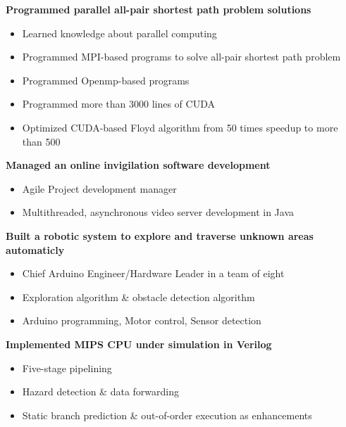 \documentclass[a4paper, 12pt]{article}
\newenvironment{changemargin}[2]{%
  \begin{list}{}{%
      \setlength{\topsep}{0pt}%
      \setlength{\leftmargin}{#1}%
      \setlength{\rightmargin}{#2}%
      \setlength{\listparindent}{\parindent}%
      \setlength{\itemindent}{\parindent}%
      \setlength{\parsep}{\parskip}%
    }%
  \item[]}{\end{list}
}
\newenvironment{body}
{
\vspace*{-16pt}
\begin{changemargin}{-0.25in}{-0.5in}
}
{
\end{changemargin}
}
\begin{document}
\begin{body}
  \vspace{14pt}
  \textbf{Programmed parallel all-pair shortest path problem solutions}\\
  \vspace*{-6pt}
    \begin{itemize} \itemsep -0pt \small
        \item Learned knowledge about parallel computing
        \item Programmed MPI-based programs to solve all-pair shortest path problem
        \item Programmed Openmp-based programs
        \item Programmed more than 3000 lines of CUDA
        \item Optimized CUDA-based Floyd algorithm from 50 times speedup to more than 500
    \end{itemize}
  \vspace*{-6pt}
  \textbf{Managed an online invigilation software development}\\
  \vspace*{-6pt}
    \begin{itemize} \itemsep -0pt \small
        \item Agile Project development manager
        \item Multithreaded, asynchronous video server development in Java
    \end{itemize}
  \vspace*{-6pt}
  \textbf{Built a robotic system to explore and traverse unknown areas automaticly}\\
  \vspace*{-6pt}
    \begin{itemize} \itemsep -0pt \small
        \item Chief Arduino Engineer/Hardware Leader in a team of eight
        \item Exploration algorithm \& obstacle detection algorithm
        \item Arduino programming, Motor control, Sensor detection
    \end{itemize}
  \vspace*{-6pt}
  \textbf{Implemented MIPS CPU under simulation in Verilog}\\
  \vspace*{-6pt}
    \begin{itemize} \itemsep -0pt \small
        \item Five-stage pipelining
        \item Hazard detection \& data forwarding
        \item Static branch prediction \& out-of-order execution as enhancements
    \end{itemize}


\end{body}
\end{document}
